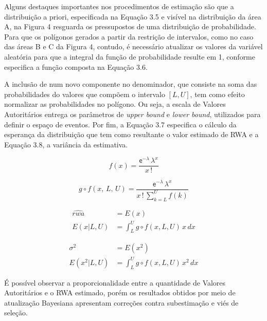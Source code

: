 \documentclass[
12pt,				%
openright,			%
twoside,			%
a4paper,			%
english,			%
french,				%
spanish,			%
brazil				%
]{abntex2}
\begin{document}
Alguns destaques importantes nos procedimentos de estimação são que a distribuição a priori, especificada na Equação 3.5 e visível na distribuição da área A, na Figura 4 resguarda os pressupostos de uma distribuição de probabilidade. Para que os polígonos gerados a partir da restrição de intervalos, como no caso das áreas B e C da Figura 4, contudo, é necessário atualizar os valores da variável aleatória para que a integral da função de probabilidade resulte em 1, conforme especifica a função composta na Equação 3.6. 

A inclusão de num novo componente no denominador, que consiste na soma das probabilidades do valores que compõem o intervalo $[L, U]$, tem como efeito normalizar as probabilidades no polígono. Ou seja, a escala de Valores Autoritários entrega os parâmetros de \emph{upper bound} e \emph{lower bound}, utilizados para definir o espaço de eventos. Por fim, a Equação 3.7 especifica o cálculo da esperança da distribuição que tem como resultante o valor estimado de RWA e a Equação 3.8, a variância da estimativa. 
     

\begin{equation}
f(x) = \frac{\mathsf{e^{-\lambda}} \,\lambda^{x}}{x\,!}
\end{equation}

\begin{equation}
g \circ f(x,\, L, \,U) =\frac{\mathsf{e^{-\lambda}} \,\lambda^{x}}{x\,! \, \displaystyle\sum_{k = L}^{U} f(k)}
\end{equation}

\begin{equation} \label{eq1}
\begin{split}
\widehat{rwa} & = E(x) \\
E(x|L, U) & = \int_{L}^{U} g \circ f(x, L, U) \,x \,dx
\end{split}
\end{equation}

\begin{equation}
\begin{split}
\sigma^{2} & = E(x^{2}) \\
E(x^{2}|L, U) & = \int_{L}^{U} g \circ f(x, L, U) \,x^{2} \,dx
\end{split}
\end{equation}

É possível observar a proporcionalidade entre a quantidade de Valores Autoritários e o RWA estimado, porém os resultados obtidos por meio de atualização Bayesiana apresentam correções contra subestimação e viés de seleção.
\end{document}
